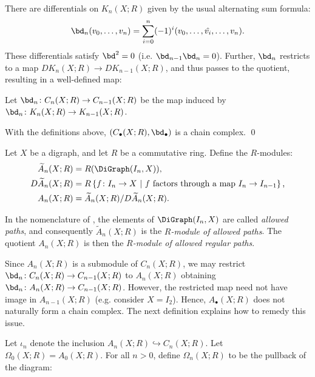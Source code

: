 There are differentials on $K_n (X ; R)$ given by the usual alternating sum formula:
\[
    \bd_n(v_0, \ldots, v_n)=\sum_{i=0}^n (-1)^i(v_0, \ldots, \hat{v_{i}}, \ldots, v_n).
\]
These differentials satisfy $\bd^2 = 0$ (i.e. $\bd_{n-1} \bd_n = 0$).
Further, $\bd_n$ restricts to a map $DK_n (X ; R) \to DK_{n-1} (X ; R)$, and thus passes to the quotient, resulting in a well-defined map:

\begin{defi}
    Let $\bd_n \colon C_n (X ; R) \to C_{n-1} (X ; R)$ be the map induced by $\bd_n \colon K_n (X ; R) \to K_{n-1} (X ; R)$.
\end{defi}

\begin{lemma}
    With the definitions above, $(C_\bullet (X ; R), \bd_\bullet)$ is a chain complex. \qed
\end{lemma}

\begin{defi}\label{defn:A_n} 
Let $X$ be a digraph, and let $R$ be a commutative ring.
Define the $R$-modules:
\begin{align*}
    \widetilde{A}_n (X ; R) &= R(\DiGraph(I_n, X))\text{,} \\
    D\widetilde{A}_n (X ; R) &= R \left\{f \colon I_n \to X \ | \ f \text{ factors through a map } I_n \to I_{n-1}\right\}\text{,} \\
    A_n (X ; R) &= \widetilde{A}_n (X ; R) / D\widetilde{A}_n (X ; R)\text{.}
\end{align*}
\end{defi}

In the nomenclature of \cite{grigor'yan-lin-muranov-yau:unpublished}, the elements of $\DiGraph(I_n, X)$ are called \emph{allowed paths}, and consequently $\widetilde{A}_n (X ; R)$ is the \emph{$R$-module of allowed paths}.
The quotient $A_n (X ; R)$ is then the \emph{$R$-module of allowed regular paths}.

Since $A_n (X ; R)$ is a submodule of $C_n (X ; R)$, we may restrict $\bd_n \colon C_n (X ; R) \to C_{n-1} (X ; R)$ to $A_n (X ; R)$ obtaining $\bd_n \colon A_n (X ; R) \to C_{n-1} (X ; R)$.
However, the restricted map need not have image in $A_{n-1} (X; R)$ (e.g. consider $X = I_2$). Hence, $A_\bullet (X ; R)$ does not naturally form a chain complex.
The next definition explains how to remedy this issue.

\begin{defi} 
Let $\iota_n$ denote the inclusion $A_n (X; R) \hookrightarrow C_n (X; R)$.
Let $\Omega_0 (X; R) = A_0 (X; R)$. 
For all $n > 0$, define $\Omega_n (X; R)$ to be the pullback of the diagram:
\begin{center}
\end{center}
\end{defi}

